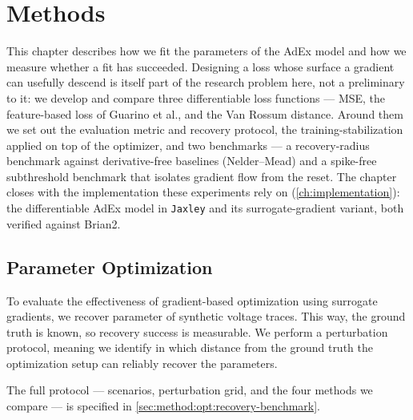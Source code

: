 \section{Methods}
\label{ch:methods}
This chapter describes how we fit the parameters of the \gls{AdEx} model and how we measure whether a fit has succeeded.
Designing a loss whose surface a gradient can usefully descend is itself part of the research problem here, not a preliminary to it: we develop and compare three differentiable loss functions --- \gls{MSE}, the feature-based loss of Guarino et al., and the Van Rossum distance.
Around them we set out the evaluation metric and recovery protocol, the training-stabilization applied on top of the optimizer, and two benchmarks --- a recovery-radius benchmark against derivative-free baselines (Nelder--Mead) and a spike-free subthreshold benchmark that isolates gradient flow from the reset.
The chapter closes with the implementation these experiments rely on (\cref{ch:implementation}): the differentiable \gls{AdEx} model in \texttt{Jaxley} and its surrogate-gradient variant, both verified against Brian2.

\subsection{Parameter Optimization}\label{sec:method:param_opt}
To evaluate the effectiveness of gradient-based optimization using surrogate gradients, we recover parameter of synthetic voltage traces.
This way, the ground truth is known, so recovery success is measurable.
We perform a perturbation protocol, meaning we identify in which distance from the ground truth the optimization setup can reliably recover the parameters.

The full protocol --- scenarios, perturbation grid, and the four methods we compare ---
is specified in \cref{sec:method:opt:recovery-benchmark}.

